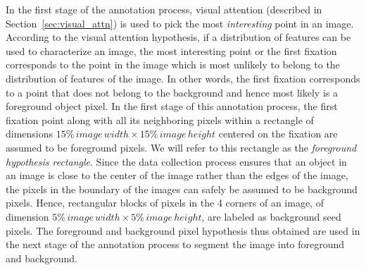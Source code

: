 \documentclass {udthesis}
\begin{document}
In the first stage of the annotation process, visual attention (described in Section~\ref{sec:visual_attn}) is used to pick the most \textit{interesting} point in an image. According to the visual attention hypothesis, if a distribution of features can be used to characterize an image, the most interesting point or the first fixation corresponds to the point in the image which is most unlikely to belong to the distribution of features of the image. In other words, the first fixation corresponds to a point that does not belong to the background and hence most likely is a foreground object pixel. In the first stage of this annotation process, the first fixation point along with all its neighboring pixels within a rectangle of dimensions $15\% \,image\, width \times 15\% \,image\, height$ centered on the fixation are assumed to be foreground pixels. We will refer to this rectangle as the \textit{foreground hypothesis rectangle}.
Since the data collection  process ensures that an object in an image is close to the center of the image rather than the edges of the image, the pixels in the boundary of the images can safely be assumed to be background pixels. Hence, rectangular blocks of pixels in the 4 corners of an image, of dimension $5\% \,image\, width \times 5\% \,image\, height$, are labeled as background seed pixels. The foreground and background pixel hypothesis thus obtained are used in the next stage of the annotation process to segment the image into foreground and background.
\end{document}

